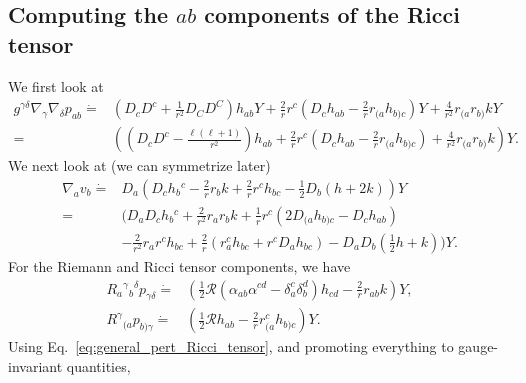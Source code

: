 \documentclass[12pt]{report}
\begin{document}
\subsection{Computing the $ab$ components of the Ricci tensor}
    We first look at
\begin{align}
    g^{\gamma\delta}\nabla_{\gamma}\nabla_{\delta}p_{ab}
    \dot{=}&
    \left( 
        D_cD^c
        +
        \frac{1}{r^2}D_CD^C
    \right)
    h_{ab}Y
    +
    \frac{2}{r}r^c
    \left(
        D_ch_{ab}
        -
        \frac{2}{r}r_{(a}h_{b)c}
    \right)
    Y
    +
    \frac{4}{r^2}r_{(a}r_{b)}k Y
    \nonumber\\
    =&
    \left(
        \left( 
            D_cD^c
            -
            \frac{\ell\left(\ell+1\right)}{r^2}
        \right)
        h_{ab}
        +
        \frac{2}{r}r^c
        \left(
            D_ch_{ab}
            -
            \frac{2}{r}r_{(a}h_{b)c}
        \right)
        +
        \frac{4}{r^2}r_{(a}r_{b)}k
    \right)
    Y
    .
\end{align}
We next look at (we can symmetrize later)
\begin{align}
    \nabla_av_b
    \dot{=}&
    D_a\left(
        D_ch_b{}^c
        -
        \frac{2}{r}r_bk
        +
        \frac{2}{r}r^ch_{bc}
        -
        \frac{1}{2}D_b\left(h + 2k\right)
    \right)
    Y
    \nonumber\\
    =&
    \Bigg(
        D_aD_ch_b{}^c
        +
        \frac{2}{r^2}r_ar_bk
        +
        \frac{1}{r}r^c\left(
            2D_{(a}h_{b)c}
            -
            D_ch_{ab}
        \right)
        \nonumber\\
        &
        -
        \frac{2}{r^2}r_ar^ch_{bc}
        +
        \frac{2}{r}\left(r_a^ch_{bc} + r^cD_ah_{bc}\right)
        -
        D_aD_b\left(\frac{1}{2}h + k\right)
    \Bigg)
    Y
    .
\end{align}
For the Riemann and Ricci tensor components, we have
\begin{align}
    R_{a}{}^{\gamma}{}_b{}^{\delta}p_{\gamma\delta}
    \dot{=}&
    \left(
        \frac{1}{2}\mathcal{R}
        \left(\alpha_{ab}\alpha^{cd} - \delta^c_a\delta^d_b\right)h_{cd}
        -
        \frac{2}{r}r_{ab}k
    \right)
    Y
    ,\\
    R^{\gamma}{}_{(a}p_{b)\gamma}
    \dot{=}&
    \left(
        \frac{1}{2}\mathcal{R}h_{ab}
        -
        \frac{2}{r}r^c_{(a}h_{b)c}
    \right)
    Y
    .
\end{align}
Using Eq.~\eqref{eq:general_pert_Ricci_tensor}, 
and promoting everything to gauge-invariant quantities,
\end{document}
